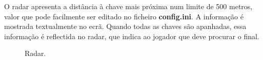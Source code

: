 O radar apresenta a distância à chave mais próxima num limite de 500 metros, valor que pode facilmente ser editado no ficheiro \textbf{config.ini}.
A informação é mostrada textualmente no ecrã. Quando todas as chaves são apanhadas, essa informação é reflectida no radar, que indica ao jogador que deve procurar o final.

\begin{figure}[here]
                 \caption{Radar.}
                 \label{fig:prototype}
\end{figure}
